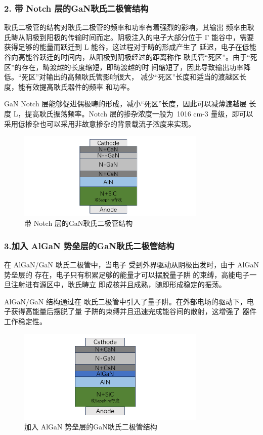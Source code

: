 \documentclass[12pt,hyperref,a4paper,UTF8]{ctexart}
\begin{document}
\subsubsection*{2. 带 Notch 层的GaN耿氏二极管结构}

耿氏二极管的结构对耿氏二极管的频率和功率有着强烈的影响，其输出
频率由耿氏畴从阴极到阳极的传输时间而定。阴极注入的电子大部分位于 Γ
能谷中，需要获得足够的能量而跃迁到 L 能谷，这过程对于畴的形成产生了
延迟，电子在低能谷向高能谷跃迁的时间内，从阳极到阴极经过的距离称作
耿氏管“死区”。由于“死区”的存在，畴渡越的长度缩短，即畴渡越的时
间缩短了，因此导致输出功率降低。“死区”对输出的高频耿氏管影响很大，
减少“死区”长度和适当的渡越区长度，能有效提高耿氏器件的频率
和功率。

GaN Notch 层能够促进偶极畴的形成，减小“死区”长度，因此可以减薄渡越层
长度 L，提高耿氏振荡频率。Notch 层的掺杂浓度一般为~1016 cm-3 量级，即可以
采用低掺杂也可以采用非故意掺杂的背景载流子浓度来实现。

\begin{figure}[H]
\centering
\includegraphics[width=0.8\textwidth]{figures/fig/image8.png}
\caption{带 Notch 层的GaN耿氏二极管结构} 
\label{fig:image5}
\end{figure}


\subsubsection*{3.加入 AlGaN 势垒层的GaN耿氏二极管结构}
在 AlGaN/GaN 耿氏二极管中，当电子
受到外界驱动从阴极出发时，由于 AlGaN 势垒层的
存在，电子只有积累足够的能量才可以摆脱量子阱
的束缚，高能电子一旦注射进有源区中，耿氏畴立
即成核并且成熟，随即形成稳定的振荡。


AlGaN/GaN 结构通过在
耿氏二极管中引入了量子阱。在外部电场的驱动下，电子获得高能量后摆脱了量
子阱的束缚并且迅速完成能谷间的散射，这增强了
器件工作稳定性。



\begin{figure}[H]
\centering
\includegraphics[width=0.8\textwidth]{figures/fig/image9.png}
\caption{加入 AlGaN 势垒层的GaN耿氏二极管结构} 
\label{fig:image5}
\end{figure}
\end{document}
